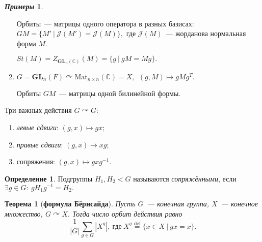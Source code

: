 \documentclass[a4paper, 14pt]{extarticle}
\newcommand{\deq}{\stackrel{\mathrm{def}}{=}}
\newcommand{\n}{\par}
\newcommand{\complex}{\mathbb{C}}
\newcommand{\GL}{\mathbf{GL}}
\newcommand{\suchthat}{{:}{ } \ }
\theoremstyle{definition}
\newtheorem*{exmpls}{\textit{Примеры}}
\newtheorem{definition}{Определение}
\theoremstyle{plain}
\newtheorem*{theorem*}{Теорема}
\numberwithin{theorem}{section}
\numberwithin{definition}{section}
\numberwithin{statement}{section}
\numberwithin{lemma}{section}
\numberwithin{consequence}{section}
\begin{document}
\begin{exmpls}
\begin{enumerate}
                Орбиты~--- матрицы одного оператора в разных базисах: ${GM = \{M' \ | \ \mathcal{J}(M') = \mathcal{J}(M)\},}$ где $\mathcal{J}(M)$~--- жорданова нормальная форма $M$.\n
                ${St(M) = Z_{\GL_n(\complex)}(M) = \{g \ | \ gM = Mg\}.}$
                \item ${G = \GL_n(F) \curvearrowright \mathrm{Mat}_{n \times n}(\complex) = X, \ \ (g,M) \mapsto gMg^T.}$\n
                Орбиты $GM$~--- матрицы одной билинейной формы.
            \end{enumerate}
            Три важных действия ${G \curvearrowright G}$:
            \begin{enumerate}
                \setlength\itemsep{0.1em}
                \item \textit{левые сдвиги}: ${(g,x) \mapsto gx;}$
                \item \textit{правые сдвиги}: ${(g,x) \mapsto xg;}$
                \item сопряжения: ${(g,x) \mapsto gxg^{-1}.}$
            \end{enumerate}
        \end{exmpls}
        \begin{definition}
            Подгруппы $H_1, H_2 < G$ называются \textit{сопряжёнными}, если $\exists g \in G\suchthat gH_1g^{-1} = H_2.$
        \end{definition}
        \begin{theorem*}[\textbf{формула Бёрнсайда}]
            Пусть $G$~--- конечная группа, $X$~--- конечное множество, ${G \curvearrowright X.}$ Тогда число орбит действия равно
            \begin{equation*}
                \frac{1}{|G|} \sum_{g \in G} |X^g|, \  \textrm{где} \ X^g \deq \{x \in X \ | \ gx = x\}.
            \end{equation*}
        \end{theorem*}
        
        \newpage
\end{document}
